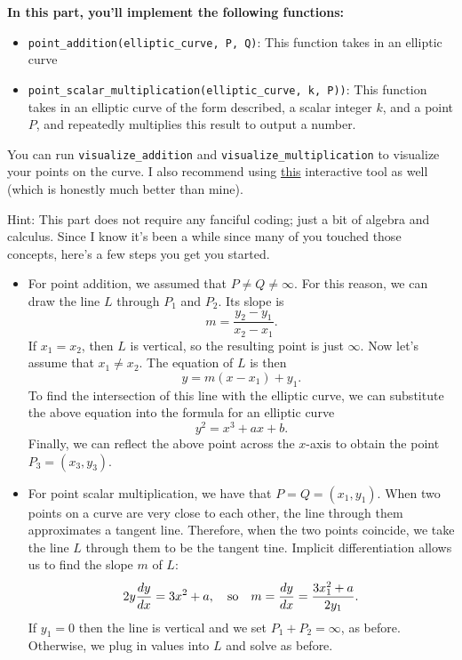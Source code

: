 \documentclass{article}
\begin{document}
\begin{tcolorbox}[enhanced,interior style={top color=Plum!20,bottom color=Plum!30}]
    \textbf{In this part, you'll implement the following functions:}
    \begin{itemize}
        \item \lstinline{point_addition(elliptic_curve, P, Q)}: This function takes in an elliptic curve 
        \item \lstinline{point_scalar_multiplication(elliptic_curve, k, P))}: This function takes in an elliptic curve of the form described, a scalar integer $k$, and a point $P$, and repeatedly multiplies this result to output a number.
    \end{itemize}
    You can run \lstinline{visualize_addition} and \lstinline{visualize_multiplication} to visualize your points on the curve. I also recommend using \href{https://andrea.corbellini.name/ecc/interactive/reals-add.html}{this} interactive tool as well (which is honestly much better than mine).

    \vspace{3mm}
    Hint: This part does not require any fanciful coding; just a bit of algebra and calculus. Since I know it's been a while since many of you touched those concepts, here's a few steps you get you started.
    \begin{itemize}
        \item For point addition, we assumed that $P \ne Q \ne \infty$. For this reason, we can draw the line $L$ through $P_{1}$ and $P_{2}$. Its slope is $$m = \frac{y_{2} - y_{1}}{x_{2} - x_{1}}.$$ If $x_{1} = x_{2}$, then $L$ is vertical, so the resulting point is just $\infty$. Now let's assume that $x_{1} \ne x_{2}$. The equation of $L$ is then $$y = m(x - x_{1}) + y_{1}.$$ To find the intersection of this line with the elliptic curve, we can substitute the above equation into the formula for an elliptic curve $$y^{2} = x^{3} + ax + b.$$ Finally, we can reflect the above point across the $x$-axis to obtain the point $P_{3} = (x_{3}, y_{3})$.
        \item For point scalar multiplication, we have that $P = Q = (x_{1}, y_{1})$. When two points on a curve are very close to each other, the line through them approximates a tangent line. Therefore, when the two points coincide, we take the line $L$ through them to be the tangent tine. Implicit differentiation allows us to find the slope $m$ of $L$: $$2y \frac{dy}{dx} = 3x^{2} + a,\text{\quad so\quad} m = \frac{dy}{dx} = \frac{3x_{1}^{2} + a}{2y_{1}}.$$ If $y_{1} = 0$ then the line is vertical and we set $P_{1} + P_{2} = \infty$, as before. Otherwise, we plug in values into $L$ and solve as before.
    \end{itemize}
    
\end{tcolorbox}
\end{document}
